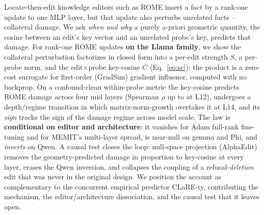 Locate-then-edit knowledge editors such as ROME insert a fact by a rank-one
update to one MLP layer, but that update also perturbs unrelated facts --
collateral damage. We ask \emph{when and why} a purely a-priori geometric
quantity, the cosine between an edit's key vector and an unrelated probe's
key, predicts that damage. For rank-one ROME updates \textbf{on the Llama
family}, we show the collateral perturbation factorizes in closed form into a
per-edit strength $S$, a per-probe norm, and the edit$\times$probe key-cosine
$C$ (Eq.~\ref{eq:sc}); the product \SxC{} is a zero-cost surrogate for
first-order (GradSim) gradient influence, computed with no backprop. On a
confound-clean within-probe metric the key-cosine predicts ROME damage across
four mid layers (Spearman $\rho$ up to \gWithinLtwelve{} at L12), undergoes a
depth/regime transition in which matrix-norm-growth overtakes it at L14, and
its \emph{sign} tracks the sign of the damage regime across model scale. The
law is \textbf{conditional on editor and architecture}: it vanishes for
Adam full-rank fine-tuning and for MEMIT's multi-layer spread, is near-null on
gemma and Phi, and \emph{inverts} on Qwen. A causal test closes the loop:
null-space projection (AlphaEdit) removes the geometry-predicted damage in
proportion to key-cosine at every layer, erases the Qwen inversion, and
collapses the coupling of a refusal-\emph{deletion} edit that was never in the
original design. We position the account as complementary to the concurrent
empirical predictor CLaRE-ty, contributing the mechanism, the
editor/architecture dissociation, and the causal test that it leaves open.
